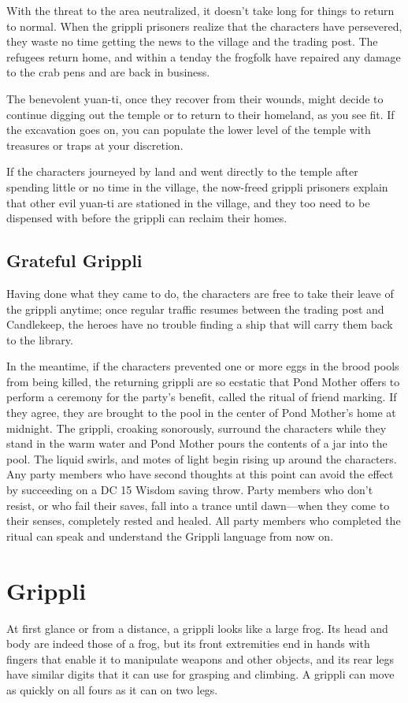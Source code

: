 \documentclass[10pt,a4paper,twoside,bg=print,twocolumn,openany,nodeprecatedcode]{dndbook}
\begin{document}
With the threat to the area neutralized, it doesn't take long for things to return to normal. When the grippli prisoners realize that the characters have persevered, they waste no time getting the news to the village and the trading post. The refugees return home, and within a tenday the frogfolk have repaired any damage to the crab pens and are back in business.

The benevolent yuan-ti, once they recover from their wounds, might decide to continue digging out the temple or to return to their homeland, as you see fit. If the excavation goes on, you can populate the lower level of the temple with treasures or traps at your discretion.

If the characters journeyed by land and went directly to the temple after spending little or no time in the village, the now-freed grippli prisoners explain that other evil yuan-ti are stationed in the village, and they too need to be dispensed with before the grippli can reclaim their homes.

\subsection{Grateful Grippli}
Having done what they came to do, the characters are free to take their leave of the grippli anytime; once regular traffic resumes between the trading post and Candlekeep, the heroes have no trouble finding a ship that will carry them back to the library.

In the meantime, if the characters prevented one or more eggs in the brood pools from being killed, the returning grippli are so ecstatic that Pond Mother offers to perform a ceremony for the party's benefit, called the ritual of friend marking. If they agree, they are brought to the pool in the center of Pond Mother's home at midnight. The grippli, croaking sonorously, surround the characters while they stand in the warm water and Pond Mother pours the contents of a jar into the pool. The liquid swirls, and motes of light begin rising up around the characters. Any party members who have second thoughts at this point can avoid the effect by succeeding on a DC 15 Wisdom saving throw. Party members who don't resist, or who fail their saves, fall into a trance until dawn—when they come to their senses, completely rested and healed. All party members who completed the ritual can speak and understand the Grippli language from now on.

\section{Grippli}
At first glance or from a distance, a grippli looks like a large frog. Its head and body are indeed those of a frog, but its front extremities end in hands with fingers that enable it to manipulate weapons and other objects, and its rear legs have similar digits that it can use for grasping and climbing. A grippli can move as quickly on all fours as it can on two legs.
\end{document}
